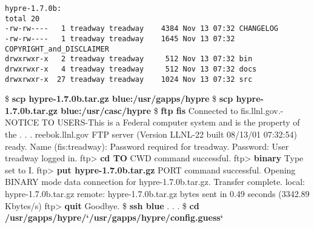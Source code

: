 \begin{ttfamily}
\begin{mdseries}
\begin{verbatim}
hypre-1.7.0b:
total 20
-rw-rw----   1 treadway treadway    4384 Nov 13 07:32 CHANGELOG
-rw-rw----   1 treadway treadway    1645 Nov 13 07:32 COPYRIGHT_and_DISCLAIMER
drwxrwxr-x   2 treadway treadway     512 Nov 13 07:32 bin
drwxrwxr-x   4 treadway treadway     512 Nov 13 07:32 docs
drwxrwxr-x  27 treadway treadway    1024 Nov 13 07:32 src
\end{verbatim}
\$ \textbf{scp hypre-1.7.0b.tar.gz blue:/usr/gapps/hypre}\linebreak
\$ \textbf{scp hypre-1.7.0b.tar.gz blue:/usr/casc/hypre}\linebreak
\$ \textbf{ftp fis}\linebreak
Connected to fis.llnl.gov.-                       NOTICE TO USERS-This is a Federal computer system and is the property of the\linebreak
 . . . reebok.llnl.gov FTP server (Version LLNL-22 built 08/13/01 07:32:54) ready.\linebreak
Name (fis:treadway):  Password required for treadway.\linebreak
Password: User treadway logged in.\linebreak
ftp> \textbf{cd TO} CWD command successful.\linebreak
ftp> \textbf{binary} Type set to I.\linebreak
ftp> \textbf{put hypre-1.7.0b.tar.gz} PORT command successful. Opening BINARY mode data connection for hypre-1.7.0b.tar.gz. Transfer complete.\linebreak
local: hypre-1.7.0b.tar.gz remote: hypre-1.7.0b.tar.gz bytes sent in 0.49 seconds (3342.89 Kbytes/s)\linebreak
ftp> \textbf{quit} Goodbye.\linebreak
\$ \textbf{ssh blue}\linebreak
 . . .\linebreak
\$ \textbf{cd /usr/gapps/hypre/`/usr/gapps/hypre/config.guess`}\linebreak

\end{mdseries}
\end{ttfamily}
